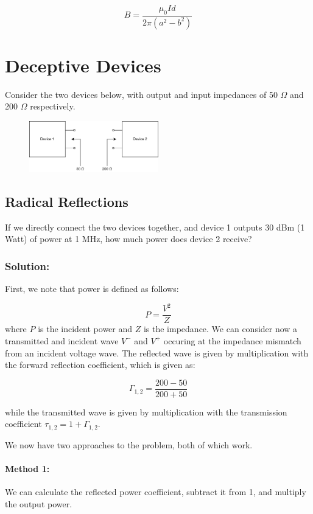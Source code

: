 \documentclass{article}
\begin{document}
\[
B = \frac{\mu_0 I d}{2\pi (a^2 - b^2)}
\]
\newpage

\section{Deceptive Devices}

Consider the two devices below, with output and input impedances of 50 $\Omega$ and 200 $\Omega$ respectively. 

\begin{figure}[H]
\begin{center}
    \includegraphics[width= 0.5\textwidth]{figures/matc.png}
\end{center}
\end{figure}
\subsection{Radical Reflections}
If we directly connect the two devices together, and device 1 outputs 30 dBm (1 Watt) of power at 1 MHz, how much power does device 2 receive?

\subsubsection{Solution:} 

First, we note that power is defined as follows:

\[
P = \frac{V^2}{Z}
\]
where $P$ is the incident power and $Z$ is the impedance. We can consider now a transmitted and incident wave $V^-$ and $V^+$ occuring at the impedance mismatch from an incident voltage wave. The reflected wave is given by multiplication with the forward reflection coefficient, which is given as:

\[
\Gamma_{1,2} = \frac{200 - 50}{200 + 50}
\]

while the transmitted wave is given by multiplication with the transmission coefficient $\tau_{1,2} = 1 + \Gamma_{1,2}$. 

\vspace{3mm}

We now have two approaches to the problem, both of which work. 

\paragraph{Method 1:} We can calculate the reflected power coefficient, subtract it from 1, and multiply the output power. 
\vspace{3mm}
\end{document}
